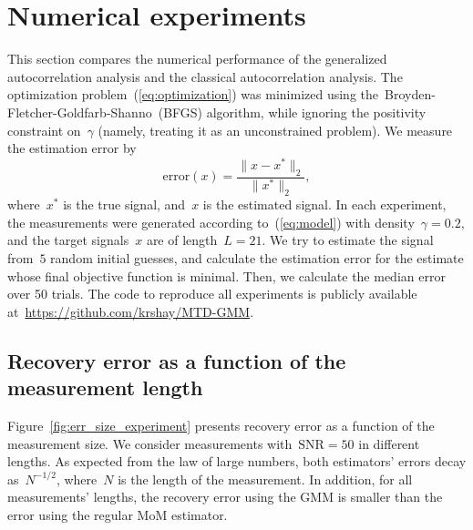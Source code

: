 \documentclass{article}
\begin{document}
\section{Numerical experiments}
\label{sec:numerical}
This section compares the numerical performance of the generalized autocorrelation analysis and the classical autocorrelation analysis. The optimization problem~(\ref{eq:optimization}) was minimized using the~\mbox{Broyden-Fletcher-Goldfarb-Shanno}~(BFGS) algorithm, while ignoring the positivity constraint on~$\gamma$ (namely, treating it as an unconstrained problem).  We measure the estimation error by
\begin{equation*}
\text{error}(x) = \frac{\|x - x^*\|_2}{\|x^*\|_2},
\end{equation*}
where~$x^*$ is the true signal, and~$x$ is the estimated signal. In each experiment, the measurements were generated according to~(\ref{eq:model}) with density~\mbox{$\gamma = 0.2$}, and the target signals~$x$ are of length~\mbox{$L = 21$}. We try to estimate the signal from~$5$ random initial guesses, and calculate the estimation error for the estimate whose final objective function is minimal. Then, we  calculate the median  error over 50 trials. The code to reproduce all experiments is publicly available at~\url{https://github.com/krshay/MTD-GMM}.


\subsection{Recovery error as a function of the measurement length}
\label{subsec:exp_size}
Figure~\ref{fig:err_size_experiment} presents recovery error as a function of the measurement size. We consider measurements with~\mbox{$\text{SNR} = 50$} in different lengths. As expected from the law of large numbers, both estimators' errors  decay as~$N^{-1/2}$, where~$N$ is the length of the measurement. In addition, for all measurements' lengths, the recovery error using the GMM is smaller than the error using the regular MoM estimator.
\end{document}
